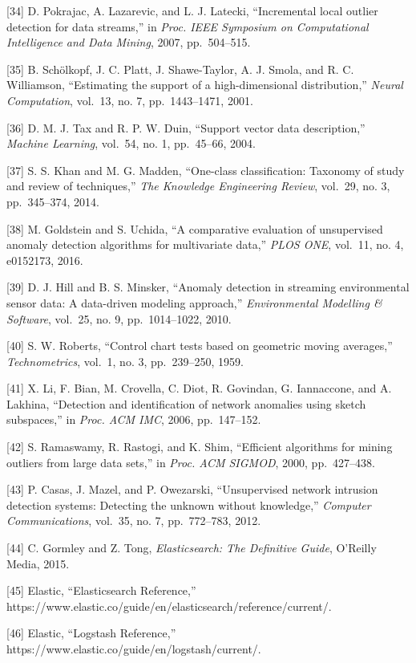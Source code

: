 \documentclass[
  a4paper]{report}
\begin{document}
{[}34{]} D. Pokrajac, A. Lazarevic, and L. J. Latecki, ``Incremental
local outlier detection for data streams,'' in \emph{Proc. IEEE
Symposium on Computational Intelligence and Data Mining}, 2007,
pp.~504--515.

{[}35{]} B. Schölkopf, J. C. Platt, J. Shawe-Taylor, A. J. Smola, and R.
C. Williamson, ``Estimating the support of a high-dimensional
distribution,'' \emph{Neural Computation}, vol.~13, no. 7,
pp.~1443--1471, 2001.

{[}36{]} D. M. J. Tax and R. P. W. Duin, ``Support vector data
description,'' \emph{Machine Learning}, vol.~54, no. 1, pp.~45--66,
2004.

{[}37{]} S. S. Khan and M. G. Madden, ``One-class classification:
Taxonomy of study and review of techniques,'' \emph{The Knowledge
Engineering Review}, vol.~29, no. 3, pp.~345--374, 2014.

{[}38{]} M. Goldstein and S. Uchida, ``A comparative evaluation of
unsupervised anomaly detection algorithms for multivariate data,''
\emph{PLOS ONE}, vol.~11, no. 4, e0152173, 2016.

{[}39{]} D. J. Hill and B. S. Minsker, ``Anomaly detection in streaming
environmental sensor data: A data-driven modeling approach,''
\emph{Environmental Modelling \& Software}, vol.~25, no. 9,
pp.~1014--1022, 2010.

{[}40{]} S. W. Roberts, ``Control chart tests based on geometric moving
averages,'' \emph{Technometrics}, vol.~1, no. 3, pp.~239--250, 1959.

{[}41{]} X. Li, F. Bian, M. Crovella, C. Diot, R. Govindan, G.
Iannaccone, and A. Lakhina, ``Detection and identification of network
anomalies using sketch subspaces,'' in \emph{Proc. ACM IMC}, 2006,
pp.~147--152.

{[}42{]} S. Ramaswamy, R. Rastogi, and K. Shim, ``Efficient algorithms
for mining outliers from large data sets,'' in \emph{Proc. ACM SIGMOD},
2000, pp.~427--438.

{[}43{]} P. Casas, J. Mazel, and P. Owezarski, ``Unsupervised network
intrusion detection systems: Detecting the unknown without knowledge,''
\emph{Computer Communications}, vol.~35, no. 7, pp.~772--783, 2012.

{[}44{]} C. Gormley and Z. Tong, \emph{Elasticsearch: The Definitive
Guide}, O'Reilly Media, 2015.

{[}45{]} Elastic, ``Elasticsearch Reference,''
https://www.elastic.co/guide/en/elasticsearch/reference/current/.

{[}46{]} Elastic, ``Logstash Reference,''
https://www.elastic.co/guide/en/logstash/current/.
\end{document}
